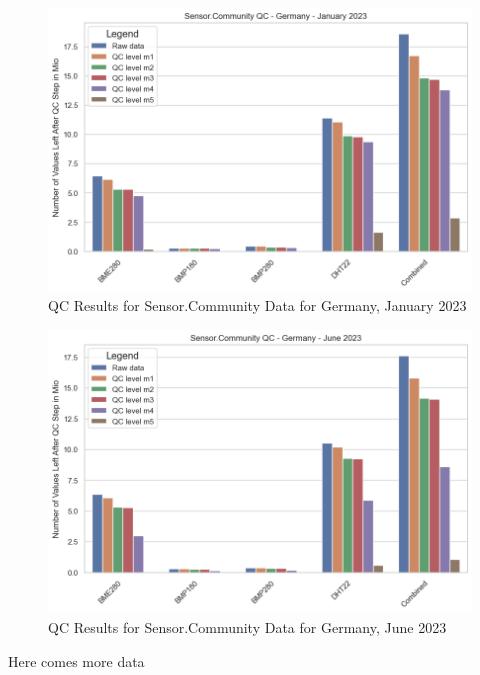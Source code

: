 \begin{figure}[ht]
    \centering
    \includegraphics[width=1\textwidth]{images/sensor_community_qc_january_23.png}
    \caption{QC Results for Sensor.Community Data for Germany, January 2023}
    \label{fig:qc sensor community jan 23}
\end{figure}

\begin{figure}[ht]
    \centering
    \includegraphics[width=1\textwidth]{images/sensor_community_qc_june_23.png}
    \caption{QC Results for Sensor.Community Data for Germany, June 2023}
    \label{fig:qc sensor community june 23}
\end{figure}

Here comes more data

